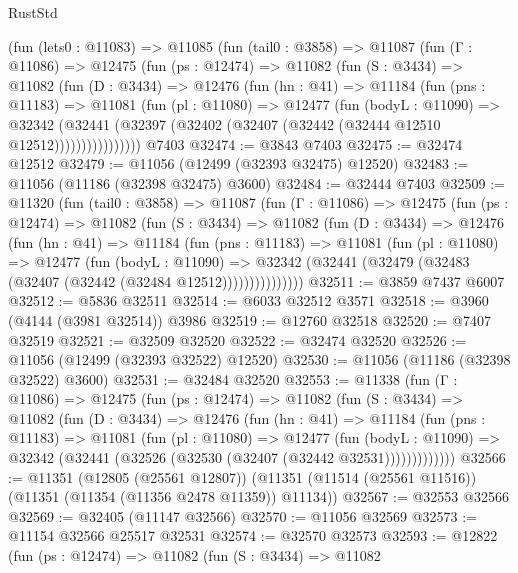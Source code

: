 \begin{lexlean}{RustStd}
\begin{coremodule}
    (fun (lets0 : @11083) =>
    @11085
      (fun (tail0 : @3858) =>
      @11087
        (fun (Γ : @11086) =>
        @12475
          (fun (ps : @12474) =>
          @11082
            (fun (S : @3434) =>
            @11082
              (fun (D : @3434) =>
              @12476
                (fun (hn : @41) =>
                @11184
                  (fun (pns : @11183) =>
                  @11081
                    (fun (pl : @11080) =>
                    @12477
                      (fun (bodyL : @11090) =>
                      @32342
                        (@32441
                          (@32397 (@32402 (@32407 (@32442 (@32444 @12510 @12512))))))))))))))))
    @7403
@32474 := @3843 @7403
@32475 := @32474 @12512
@32479 := @11056 (@12499 (@32393 @32475) @12520)
@32483 := @11056 (@11186 (@32398 @32475) @3600)
@32484 := @32444 @7403
@32509 := @11320
    (fun (tail0 : @3858) =>
    @11087
      (fun (Γ : @11086) =>
      @12475
        (fun (ps : @12474) =>
        @11082
          (fun (S : @3434) =>
          @11082
            (fun (D : @3434) =>
            @12476
              (fun (hn : @41) =>
              @11184
                (fun (pns : @11183) =>
                @11081
                  (fun (pl : @11080) =>
                  @12477
                    (fun (bodyL : @11090) =>
                    @32342 (@32441 (@32479 (@32483 (@32407 (@32442 (@32484 @12512)))))))))))))))
@32511 := @3859 @7437 @6007
@32512 := @5836 @32511
@32514 := @6033 @32512 @3571
@32518 := @3960 (@4144 (@3981 @32514)) @3986
@32519 := @12760 @32518
@32520 := @7407 @32519
@32521 := @32509 @32520
@32522 := @32474 @32520
@32526 := @11056 (@12499 (@32393 @32522) @12520)
@32530 := @11056 (@11186 (@32398 @32522) @3600)
@32531 := @32484 @32520
@32553 := @11338
    (fun (Γ : @11086) =>
    @12475
      (fun (ps : @12474) =>
      @11082
        (fun (S : @3434) =>
        @11082
          (fun (D : @3434) =>
          @12476
            (fun (hn : @41) =>
            @11184
              (fun (pns : @11183) =>
              @11081
                (fun (pl : @11080) =>
                @12477
                  (fun (bodyL : @11090) =>
                  @32342 (@32441 (@32526 (@32530 (@32407 (@32442 @32531)))))))))))))
@32566 := @11351
    (@12805 (@25561 @12807))
    (@11351 (@11514 (@25561 @11516)) (@11351 (@11354 (@11356 @2478 @11359)) @11134))
@32567 := @32553 @32566
@32569 := @32405 (@11147 @32566)
@32570 := @11056 @32569
@32573 := @11154 @32566 @25517 @32531
@32574 := @32570 @32573
@32593 := @12822
    (fun (ps : @12474) =>
    @11082
      (fun (S : @3434) =>
      @11082

\end{coremodule}
\end{lexlean}
